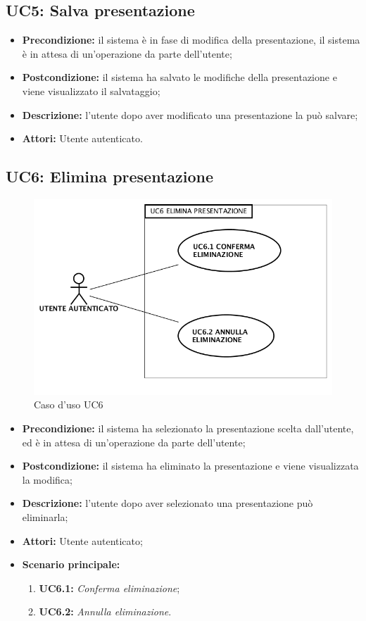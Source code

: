 \subsection{ UC5: Salva presentazione}

\begin{itemize}
	\item \textbf{Precondizione:} il sistema è in fase di modifica della presentazione, il sistema è in attesa di un'operazione da parte dell'utente;
	\item \textbf{Postcondizione:} il sistema ha salvato le modifiche della presentazione e viene visualizzato il salvataggio;
	\item \textbf{Descrizione:} l'utente dopo aver modificato una presentazione la può salvare;
	\item \textbf{Attori:} Utente autenticato.
\end{itemize}
\subsection{ UC6: Elimina presentazione}

\begin{figure}[h]
	\begin{center}
	\includegraphics[scale=0.4]{diagram/UC6.png}
	\caption{Caso d'uso UC6}
	\end{center}
\end{figure}
\begin{itemize}
	\item \textbf{Precondizione:} il sistema ha selezionato la presentazione scelta dall'utente, ed è in attesa di un'operazione da parte dell'utente;
	\item \textbf{Postcondizione:} il sistema ha eliminato la presentazione e viene visualizzata la modifica;
	\item \textbf{Descrizione:} l'utente dopo aver selezionato una presentazione può eliminarla;
	\item \textbf{Attori:} Utente autenticato;
	\item \textbf{Scenario principale:}
	\begin{enumerate}
		\item \textbf{ UC6.1:} \textit{ Conferma eliminazione};
		\item \textbf{ UC6.2:} \textit{ Annulla eliminazione}.
	\end{enumerate}
\end{itemize}
